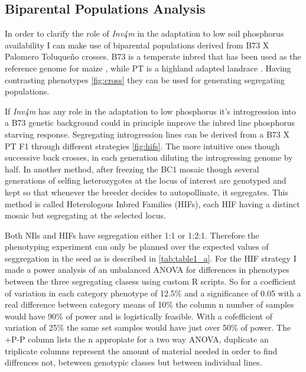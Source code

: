 \documentclass[10pt,letterpaper]{article}
\begin{document}
\subsection*{Biparental Populations Analysis}

In order to clarify the role of \textit{Inv4m} in the adaptation to low soil phosphorus availability I can make use of biparental populations derived from  B73 X Palomero Toluqueño crosses. B73 is a temperate inbred that has been used as the reference genome for maize \cite{schnable2009}, while PT is a highland adapted landrace \cite{vielle-calzada2009}. Having contrasting phenotypes \ref{fig:cross} they can be used for generating segregating populations.

If \textit{Inv4m} has any role in the adaptation to low phosphorus it's introgression into a B73 genetic background could in principle improve the inbred line phosphorus starving response. Segregating introgression lines can be derived from a B73 X PT F1 through different strategies \ref{fig:hifs}. The more intuitive ones though successive back crosses, in each g{}eneration diluting the introgressing genome by half. In another method, after freezing the BC1 mosaic though several generations of selfing heterozygotes at the locus of interest are genotyped and kept so that whenever the breeder decides to autopollinate, it segregates. This method is called Heterologous Inbred Families (HIFs), each HIF having a distinct mosaic but segregating at the selected locus.

Both NIls and HIFs have segregation either 1:1 or 1:2:1. Therefore the phenotyping experiment can only be planned over the expected values of seggregation in the seed as is described in \ref{tab:table1_a}. For the HIF strategy I made a power analysis of an unbalanced ANOVA for differences in phenotypes between the three segregating clasess using custom R scripts. So for a coefficient of variation in each category phenotype of 12.5\% and a significance of 0.05 with a real difference between category means of 10\% the column n number of samples would have 90\% of power and is logistically feasible. With a cofefficient of variation of 25\% the same set samples would have just over 50\% of power.  The +P-P column lists the n appropiate for a two way ANOVA, duplicate an triplicate columns represent the amount of material needed in order to find diffrences not, beteween genotypic classes but between individual lines.
\end{document}
